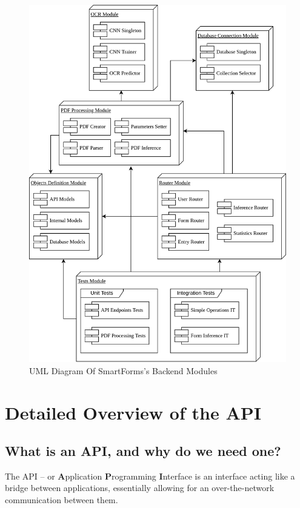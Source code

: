 \documentclass[11pt, a4paper]{report}
\begin{document}
\begin{figure}[!h]
	\centering
	\includegraphics[width=37em]{images/diagrams/ProjectModulesDiagram.png}
	\caption{UML Diagram Of SmartForms's Backend Modules}
	\label{smart-forms-modules}
\end{figure}


\chapter{Detailed Overview of the API}

\section{What is an API, and why do we need one?}

The API -- or \textbf{A}pplication \textbf{P}rogramming \textbf{I}nterface is an interface acting like a bridge between applications, essentially allowing for an over-the-network communication between them.
\end{document}
